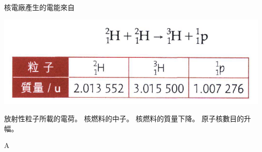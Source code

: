 {
    核電廠產生的電能來自
    \par{\par\centering\includegraphics[width=.5\textwidth]{./img/ch8_radiation_mc_2024-06-25-16-29-05.png}\par}
    \begin{tasks}
        \task 放射性粒子所載的電荷。
        \task 核燃料的中子。
        \task 核燃料的質量下降。
        \task 原子核數目的升幅。
    \end{tasks}

}{A}